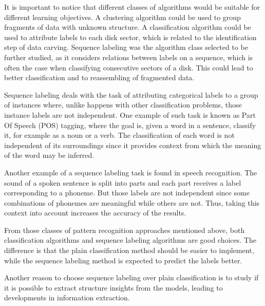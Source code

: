 It is important to notice that different classes of algorithms would be suitable for different learning objectives.
A clustering algorithm could be used to group fragments of data with unknown structure.
A classification algorithm could be used to attribute labels to each disk sector, which is related to the identification step of data carving. 
Sequence labeling was the algorithm class selected to be further studied, as it considers relations between labels on a sequence, which is often the case when classifying consecutive sectors of a disk. This could lead to better classification and to reassembling of fragmented data.

Sequence labeling deals with the task of attributing categorical labels to a group of instances where, unlike happens with other classification problems, those instance labels are not independent.
One example of such task is known as Part Of Speech (POS) tagging, where the goal is, given a word in a sentence, classify it, for example as a noun or a verb.
The classification of each word is not independent of its surroundings since it provides context from which the meaning of the word may be inferred.

Another example of a sequence labeling task is found in speech recognition.
The sound of a spoken sentence is split into parts and each part receives a label corresponding to a phoneme. But those labels are not independent since some combinations of phonemes are meaningful while others are not. Thus, taking this context into account increases the accuracy of the results.

From those classes of pattern recognition approaches mentioned above, both classification algorithms and sequence labeling algorithms are good choices.
The difference is that the plain classification method should be easier to implement, while the sequence labeling method is expected to predict the labels better.

Another reason to choose sequence labeling over plain classification is to study if it is possible to extract structure insights from the models, leading to developments in information extraction.
